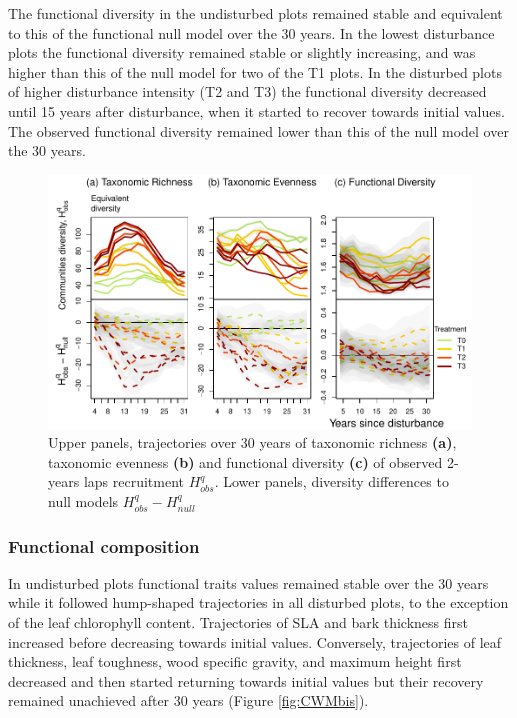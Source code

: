 \documentclass[
  11pt,
  french,
  A4paper,
  extrafontsizes,onecolumn,openright
  ]{memoir}
\begin{document}
The functional diversity in the undisturbed plots remained stable and
equivalent to this of the functional null model over the 30 years. In
the lowest disturbance plots the functional diversity remained stable or
slightly increasing, and was higher than this of the null model for two
of the T1 plots. In the disturbed plots of higher disturbance intensity
(T2 and T3) the functional diversity decreased until 15 years after
disturbance, when it started to recover towards initial values. The
observed functional diversity remained lower than this of the null model
over the 30 years.

\begin{figure}

{\centering \includegraphics[width=1\linewidth]{Manuscript_files/figure-latex/DivTraj-1} 

}

\caption{Upper panels, trajectories over 30 years of taxonomic richness \textbf{(a)}, taxonomic evenness \textbf{(b)} and functional diversity \textbf{(c)} of observed 2-years laps recruitment $H_{obs}^q$. Lower panels, diversity differences to null models $H_{obs}^q - H_{null}^q$}\label{fig:DivTraj}
\end{figure}

\subsubsection{Functional composition}\label{functional-composition}

In undisturbed plots functional traits values remained stable over the
30 years while it followed hump-shaped trajectories in all disturbed
plots, to the exception of the leaf chlorophyll content. Trajectories of
SLA and bark thickness first increased before decreasing towards initial
values. Conversely, trajectories of leaf thickness, leaf toughness, wood
specific gravity, and maximum height first decreased and then started
returning towards initial values but their recovery remained unachieved
after 30 years (Figure \ref{fig:CWMbis}).
\end{document}
